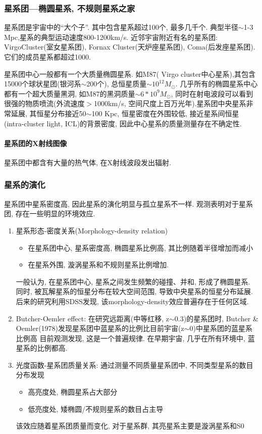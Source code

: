 \subsubsection{星系团---椭圆星系, 不规则星系之家}
星系团是宇宙中的``大个子''. 其中包含星系超过100个, 最多几千个. 典型半径$\sim$1-3 Mpc,星系的典型运动速度800-1200km/s. 近邻宇宙附近有名的星系团: VirgoCluster(室女星系团), Fornax Cluster(天炉座星系团), Coma(后发座星系团). 它们的成员星系都超过1000. 

星系团中心一般都有一个大质量椭圆星系. 如M87( Virgo cluster中心星系),其包含15000个球状星团(银河系$\sim$200个), 总恒星质量$\sim  10^{12} M_{\odot}$. 几乎所有的椭圆星系中心都有一个超大质量黑洞, 如M87的黑洞质量$\sim 6*10^9 M_{\odot}$, 同时在射电波段可以看到很强的物质喷流(外流速度$>$1000km/s, 空间尺度上百万光年).星系团中央星系非常延展, 其恒星分布接近50$\sim$100 Kpc, 恒星密度在外围较低, 接近星系间恒星(intra-cluster light, ICL)的背景密度, 因此中心星系的质量测量存在不确定性. 

\paragraph{星系团的X射线图像}
星系团中都含有大量的热气体, 在X射线波段发出辐射. 

\subsubsection{星系的演化}
星系团中星系密度高, 因此星系的演化明显与孤立星系不一样. 观测表明对于星系团, 存在一些明显的环境效应. 
\begin{enumerate}\small 
    \item 星系形态-密度关系(Morphology-density relation)
    \begin{itemize}
        \item 在星系团中心, 星系密度高, 椭圆星系比例高, 其比例随着半径增加而减小
        \item 在星系外围, 漩涡星系和不规则星系比例增加. 
    \end{itemize}
    \subitem 一般认为, 在星系团中心, 星系之间发生频繁的碰撞、并和, 形成了椭圆星系. 同时, 被瓦解星系的恒星分布在较大空间范围, 导致中央星系的恒星分布延展. 
    \subitem 后来的研究利用SDSS发现, 该morphology-density效应普遍存在于任何区域. 
    \item Butcher-Oemler effect: 在研究远距离(中等红移, z$\sim$0.3)的星系团时, Butcher \& Oemler(1978)发现星系团中蓝星系的比例比目前宇宙(z$\sim$0)中星系团的蓝星系比例高
    \subitem 目前观测发现, 这是一个普遍规律. 在早期宇宙, 几乎在所有环境中, 蓝星系的比例都高. 
    \item 光度函数-星系团质量关系: 通过测量不同质量星系团中, 不同类型星系的数目分布发现
    \begin{itemize}
        \item 高亮度处, 椭圆星系占大部分
        \item 低亮度处, 矮椭圆/不规则星系的数目占主导    
    \end{itemize}
    该效应随着星系团质量而变化, 对于星系群, 其亮星系主要是漩涡星系和S0 
\end{enumerate}

